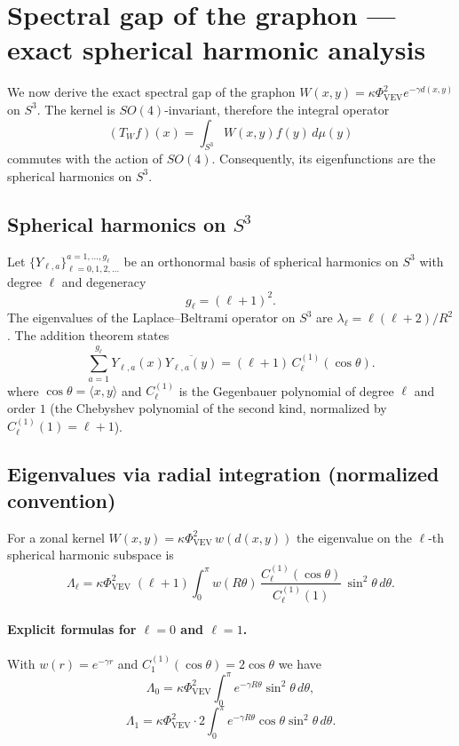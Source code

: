 \documentclass[12pt]{article}
\numberwithin{equation}{section}
\newcommand{\VEV}{\Phi_{\mathrm{VEV}}}
\newcommand{\SphereR}{R}
\begin{document}
\section{Spectral gap of the graphon — exact spherical harmonic analysis}
\label{sec:spectral}

We now derive the exact spectral gap of the graphon \(W(x,y) = \kappa \VEV^2 e^{-\gamma d(x,y)}\) on \(S^3\). The kernel is \(SO(4)\)-invariant, therefore the integral operator
\[
(T_W f)(x) = \int_{S^3} W(x,y) f(y) \, d\mu(y) \tag{47}
\]
commutes with the action of \(SO(4)\). Consequently, its eigenfunctions are the spherical harmonics on \(S^3\).

\subsection{Spherical harmonics on \(S^3\)}

Let \(\{Y_{\ell,a}\}_{\ell=0,1,2,\dots}^{a=1,\dots,g_\ell}\) be an orthonormal basis of spherical harmonics on \(S^3\) with degree \(\ell\) and degeneracy
\[
g_\ell = (\ell+1)^2. \tag{48}
\]
The eigenvalues of the Laplace–Beltrami operator on \(S^3\) are \(\lambda_\ell = \ell(\ell+2)/\SphereR^2\). The addition theorem states
\begin{equation}\label{eq:addition}
\sum_{a=1}^{g_\ell} Y_{\ell,a}(x) \overline{Y_{\ell,a}(y)} = (\ell+1) \, C_\ell^{(1)}(\cos\theta).
\end{equation}
where \(\cos\theta = \langle x, y \rangle\) and \(C_\ell^{(1)}\) is the Gegenbauer polynomial of degree \(\ell\) and order \(1\) (the Chebyshev polynomial of the second kind, normalized by \(C_\ell^{(1)}(1) = \ell+1\)).

\subsection{Eigenvalues via radial integration (normalized convention)}

For a zonal kernel \(W(x,y)=\kappa\VEV^2\,w(d(x,y))\) the eigenvalue on the \(\ell\)-th spherical harmonic subspace is
\begin{equation}\label{eq:Lambda_ell_normalized}
\Lambda_\ell = \kappa\VEV^2\;(\ell+1)\int_0^\pi w(\SphereR\theta)\,\frac{C_\ell^{(1)}(\cos\theta)}{C_\ell^{(1)}(1)}\,\sin^2\theta\,d\theta.
\end{equation}

\paragraph{Explicit formulas for \(\ell = 0\) and \(\ell = 1\).} With \(w(r)=e^{-\gamma r}\) and \(C_1^{(1)}(\cos\theta)=2\cos\theta\) we have
\[
\Lambda_0 = \kappa\VEV^2 \int_0^\pi e^{-\gamma\SphereR\theta} \sin^2\theta\,d\theta,
\]
\[
\Lambda_1 = \kappa\VEV^2 \cdot 2 \int_0^\pi e^{-\gamma\SphereR\theta} \cos\theta \sin^2\theta\,d\theta.
\]
\end{document}
